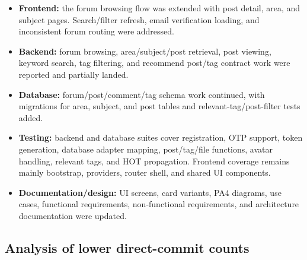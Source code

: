\documentclass[12pt]{article}
\begin{document}
\begin{itemize}

\item \textbf{Frontend:} the forum browsing flow was extended with post detail, area, and subject pages. Search/filter refresh, email verification loading, and inconsistent forum routing were addressed.

\item \textbf{Backend:} forum browsing, area/subject/post retrieval, post viewing, keyword search, tag filtering, and recommend post/tag contract work were reported and partially landed.

\item \textbf{Database:} forum/post/comment/tag schema work continued, with migrations for area, subject, and post tables and relevant-tag/post-filter tests added.

\item \textbf{Testing:} backend and database suites cover registration, OTP support, token generation, database adapter mapping, post/tag/file functions, avatar handling, relevant tags, and HOT propagation. Frontend coverage remains mainly bootstrap, providers, router shell, and shared UI components.

\item \textbf{Documentation/design:} UI screens, card variants, PA4 diagrams, use cases, functional requirements, non-functional requirements, and architecture documentation were updated.

\end{itemize}

\subsection{Analysis of lower direct-commit counts}
\end{document}
